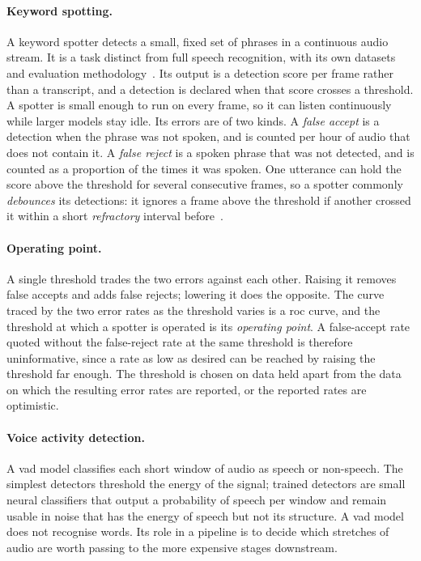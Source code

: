 \paragraph{Keyword spotting.} A keyword spotter detects a small, fixed set of phrases in a
continuous audio stream. It is a task distinct from full speech recognition, with its own datasets
and evaluation methodology~\cite{speechcmd}. Its output is a detection score per frame rather than a
transcript, and a detection is declared when that score crosses a threshold. A spotter is small
enough to run on every frame, so it can listen continuously while larger models stay idle. Its
errors are of two kinds. A \emph{false accept} is a detection when the phrase was not spoken, and is
counted per hour of audio that does not contain it. A \emph{false reject} is a spoken phrase that
was not detected, and is counted as a proportion of the times it was spoken. One utterance can hold
the score above the threshold for several consecutive frames, so a spotter commonly \emph{debounces}
its detections: it ignores a frame above the threshold if another crossed it within a short
\emph{refractory} interval before~\cite{speechcmd}.

\paragraph{Operating point.} A single threshold trades the two errors against each other. Raising
it removes false accepts and adds false rejects; lowering it does the opposite. The curve traced by
the two error rates as the threshold varies is a \gls{roc} curve, and the threshold at which a
spotter is operated is its \emph{operating point}. A false-accept rate quoted without the
false-reject rate at the same threshold is therefore uninformative, since a rate as low as desired
can be reached by raising the threshold far enough. The threshold is chosen on
data held apart from the data on which the resulting error rates are reported, or the reported
rates are optimistic.

\paragraph{Voice activity detection.} A \gls{vad} model classifies each short window of audio as
speech or non-speech. The simplest detectors threshold the energy of the signal; trained detectors
are small neural classifiers that output a probability of speech per window and remain usable in
noise that has the energy of speech but not its structure. A \gls{vad} model does not recognise
words. Its role in a pipeline is to decide which stretches of audio are worth passing to the more
expensive stages downstream.

